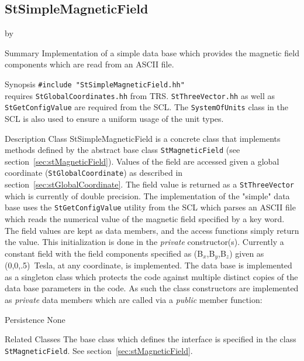 \documentclass[twoside]{article}
\newcommand{\name}[1]{\textsf{#1}}%
\newcommand{\comp}[1]{\texttt{#1}}%
\newcommand{\entrylabel}[1]{\mbox{\textbf{{#1}}}\hfil}%
\newenvironment{entry}
{\begin{list}{}%
    {\renewcommand{\makelabel}{\entrylabel}%
     \setlength{\labelwidth}{90pt}%
     \setlength{\leftmargin}{\labelwidth}
     \advance\leftmargin by \labelsep%
      }%
    }%
  {\end{list}}
\newcommand{\Entrylabel}[1]%
{\raisebox{0pt}[1ex][0pt]{\makebox[\labelwidth][l]%
    {\parbox[t]{\labelwidth}{\hspace{0pt}\textbf{{#1}}}}}}
\newenvironment{Entry}%
{\renewcommand{\entrylabel}{\Entrylabel}\begin{entry}}%
  {\end{entry}}
\begin{document}
\subsection{StSimpleMagneticField} 
\label{sec:stSimpleMagneticField}
\begin{Entry}
\item[Summary]
  Implementation of a simple data base which provides the magnetic 
  field components which are read from an ASCII file.

\item[Synopsis]
  \verb+#include "StSimpleMagneticField.hh"+\\
  requires \comp{StGlobalCoordinates.hh} from \name{TRS}. 
  \comp{StThreeVector.hh} as well as \comp{StGetConfigValue}
  are required from the SCL.    The \comp{SystemOfUnits} class in 
  the SCL is also used to ensure a uniform usage of the unit types.
  
\item[Description]
Class StSimpleMagneticField is a concrete class that implements
methods defined by the abstract base class \comp{StMagneticField}
(see section~\ref{sec:stMagneticField}).  Values
of the field are accessed given a global coordinate (\comp{StGlobalCoordinate})
as described in section~\ref{sec:stGlobalCoordinate}.  The field
value is returned as a \comp{StThreeVector} which is currently
of double precision.
The implementation of the "simple" data base uses the \comp{StGetConfigValue}
utility from the SCL which parses an ASCII file which reads the
numerical value of the magnetic field specified by a key word.  The
field values are kept as data members, and the access functions
simply return the value.  This initialization is done in the {\em private}
constructor(s).  Currently a constant field 
with the field components specified as (B$_{x}$,B$_{y}$,B$_{z}$) 
given as (0,0,.5)~Tesla, at any coordinate, is implemented.
The data base is implemented as a singleton class 
which protects the code against multiple distinct copies of the
data base parameters in the code.  As such the class constructors
are implemented as {\em private} data members which are called
via a {\em public} member function:

\item[Persistence]
   None

\item[Related Classes]
The base class which defines the interface is specified in
the class \comp{StMagneticField}.  
See section~\ref{sec:stMagneticField}.


\end{Entry}
\end{document}
